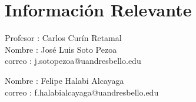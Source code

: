 \documentclass[10pt,letterpaper,twocolumn]{article}
\begin{document}
\begin{table}[h] %
\centering %
\caption{Periodos de oscilación medidos}
\label{tab:periodos_oscilacion}
\end{table}

\section*{Información Relevante}

Profesor : Carlos Curín Retamal \\

Nombre : José Luis Soto Pezoa\\
correo : j.sotopezoa@uandresbello.edu

Nombre : Felipe Halabi Alcayaga\\
correo : f.halabialcayaga@uandresbello.edu
\end{document}
